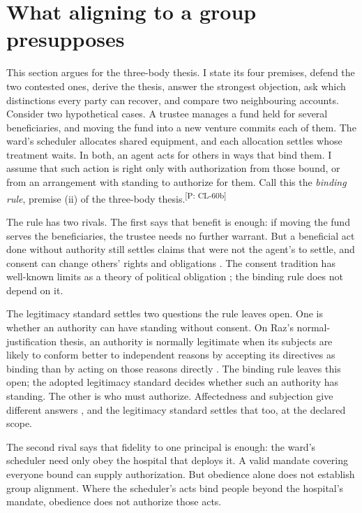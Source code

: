\documentclass[pdflatex,sn-basic]{sn-jnl}%
\newcommand{\slot}[1]{}%
\newcommand{\claim}[2]{\ifannotated\textsuperscript{\textcolor{blue!60!black}{\tiny[#1: #2]}}\fi}
\begin{document}
\FloatBarrier%
\section{What aligning to a group presupposes}\label{sec:coordination}

\slot{3.1}
This section argues for the three-body thesis. I state its four premises, defend the two contested ones, derive the thesis, answer the strongest objection, ask which distinctions every party can recover, and compare two neighbouring accounts. Consider two hypothetical cases. A trustee manages a fund held for several beneficiaries, and moving the fund into a new venture commits each of them. The ward's scheduler allocates shared equipment, and each allocation settles whose treatment waits. In both, an agent acts for others in ways that bind them. I assume that such action is right only with authorization from those bound, or from an arrangement with standing to authorize for them. Call this the \emph{binding rule}, premise (ii) of the three-body thesis.\claim{P}{CL-60b}

The rule has two rivals. The first says that benefit is enough: if moving the fund serves the beneficiaries, the trustee needs no further warrant. But a beneficial act done without authority still settles claims that were not the agent's to settle, and consent can change others' rights and obligations \citep{hurd1996}. The consent tradition has well-known limits as a theory of political obligation \citep{simmons1979}; the binding rule does not depend on it.

The legitimacy standard settles two questions the rule leaves open. One is whether an authority can have standing without consent. On Raz's normal-justification thesis, an authority is normally legitimate when its subjects are likely to conform better to independent reasons by accepting its directives as binding than by acting on those reasons directly \citep[ch.~3]{raz1986}. The binding rule leaves this open; the adopted legitimacy standard decides whether such an authority has standing. The other is who must authorize. Affectedness and subjection give different answers \citep{nasstrom2011}, and the legitimacy standard settles that too, at the declared scope.

The second rival says that fidelity to one principal is enough: the ward's scheduler need only obey the hospital that deploys it. A valid mandate covering everyone bound can supply authorization. But obedience alone does not establish group alignment. Where the scheduler's acts bind people beyond the hospital's mandate, obedience does not authorize those acts.
\end{document}
